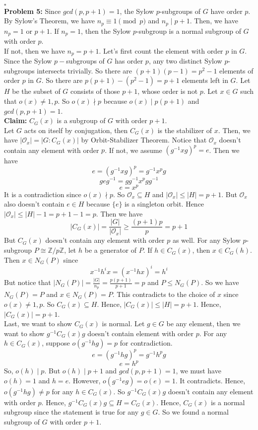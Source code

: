 \documentclass[12pt]{amsart}
\newcommand{\Z}{\mathbb{Z}}
\newcommand{\Orbit}{\mathcal{O}}
\begin{document}
\\\phantom{qed}\hfill$\square$\\
\textbf{Problem 5:} Since $gcd(p,p+1)=1$, the Sylow $p$-subgroups of $G$ have order $p$. By Sylow's Theorem, we have $n_p\equiv 1\pmod p$ and $n_p\mid p+1$. Then, we have $n_p=1$ or $p+1$. If $n_p=1$, then the Sylow $p$-subgroup is a normal subgroup of $G$ with order $p$.\\
If not, then we have $n_p=p+1$. Let's first count the element with order $p$ in $G$. Since the Sylow $p-$subgroups of $G$ has order $p$, any two distinct Sylow $p$-subgroups intersects trivially. So there are $(p+1)(p-1)=p^2-1$ elements of order $p$ in $G$. So there are $p(p+1)-(p^2-1)=p+1$ elements left in $G$. Let $H$ be the subset of $G$ consists of those $p+1$, whose order is not $p$. Let $x\in G$ such that $o(x)\neq 1,p$. So $o(x)\nmid p$ because $o(x)\mid p(p+1)$ and $gcd(p,p+1)=1$.\\
\textbf{Claim:} $C_G(x)$ is a subgroup of $G$ with order $p+1$.\\
Let $G$ acts on itself by conjugation, then $C_G(x)$ is the stabilizer of $x$. Then, we have $|\Orbit_x|=|G:C_G(x)|$ by Orbit-Stabilizer Theorem. Notice that $\Orbit_x$ doesn't contain any element with order $p$. If not, we assume $(g^{-1}xg)^p=e$. Then we have 
\[e=(g^{-1}xg)^p=g^{-1}x^pg\]
\[geg^{-1}=gg^{-1}x^pgg^{-1}\]
\[e=x^p\]
It is a contradiction since $o(x)\nmid p$. So $\Orbit_x\subseteq H$ and $|\Orbit_x|\leq |H|=p+1$. But $\Orbit_x$ also doesn't contain $e\in H$ because $\{e\}$ is a singleton orbit. Hence $|\Orbit_x|\leq |H|-1=p+1-1=p$. Then we have 
\[|C_G(x)|=\frac{|G|}{|\Orbit_x|}\geq \frac{(p+1)p}{p}=p+1\]
But $C_G(x)$ doesn't contain any element with order $p$ as well. For any Sylow $p$-subgroup $P\cong \Z/p\Z$, let $h$ be a generator of $P$. If $h\in C_G(x)$, then $x\in C_G(h)$. Then $x\in N_G(P)$ since 
\[x^{-1}h^ix=(x^{-1}hx)^i=h^i\]
But notice that $|N_G(P)|=\frac{|G|}{n_p}=\frac{p(p+1)}{p+1}=p$ and $P\leq N_G(P)$. So we have $N_G(P)=P$ and $x\in N_G(P)=P$. This contradicts to the choice of $x$ since $o(x)\neq 1,p$. So $C_G(x)\subseteq H$. Hence, $|C_G(x)|\leq |H|=p+1$. Hence, $|C_G(x)|=p+1$.\\
Last, we want to show $C_G(x)$ is normal. Let $g\in G$ be any element, then we want to show $g^{-1}C_G(x)g$ doesn't contain element with order $p$. For any $h\in C_G(x)$, suppose $o(g^{-1}hg)=p$ for contradiction.
\[e=(g^{-1}hg)^p=g^{-1}h^pg\]
\[e=h^p\]
So, $o(h)\mid p$. But $o(h)\mid p+1$ and $gcd(p,p+1)=1$, we must have $o(h)=1$ and $h=e$. However, $o(g^{-1}eg)=o(e)=1$. It contradicts. Hence, $o(g^{-1}hg)\neq p$ for any $h\in C_G(x)$. So $g^{-1}C_G(x)g$ doesn't contain any element with order $p$. Hence, $g^{-1}C_G(x)g\subseteq H=C_G(x)$. Hence, $C_G(x)$ is a normal subgroup since the statement is true for any $g\in G$. So we found a normal subgroup of $G$ with order $p+1$.
\end{document}
